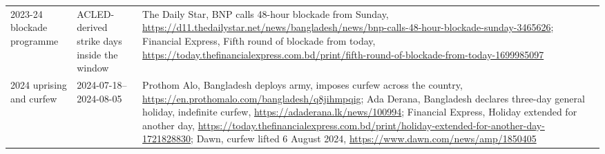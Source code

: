 \begin{longtable}{L{3.0cm} L{4.2cm} L{8.4cm}}
2023-24 blockade programme & ACLED-derived strike days inside the window & The Daily Star, BNP calls 48-hour blockade from Sunday, \url{https://d11.thedailystar.net/news/bangladesh/news/bnp-calls-48-hour-blockade-sunday-3465626}; Financial Express, Fifth round of blockade from today, \url{https://today.thefinancialexpress.com.bd/print/fifth-round-of-blockade-from-today-1699985097} \\
2024 uprising and curfew & 2024-07-18--2024-08-05 & Prothom Alo, Bangladesh deploys army, imposes curfew across the country, \url{https://en.prothomalo.com/bangladesh/q8jihmpqig}; Ada Derana, Bangladesh declares three-day general holiday, indefinite curfew, \url{https://adaderana.lk/news/100994}; Financial Express, Holiday extended for another day, \url{https://today.thefinancialexpress.com.bd/print/holiday-extended-for-another-day-1721828830}; Dawn, curfew lifted 6 August 2024, \url{https://www.dawn.com/news/amp/1850405} \\
\end{longtable}
\endgroup
